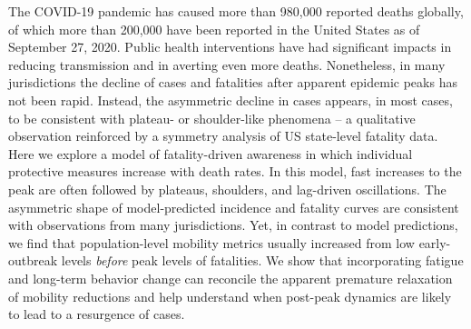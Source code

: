 The COVID-19 pandemic has caused more than 980,000 reported deaths globally, of which more than 200,000 have been reported in the United States as of September 27, 2020. 
Public health interventions have had significant impacts in reducing transmission and in averting even more deaths. 
Nonetheless, in many jurisdictions the decline of cases and fatalities after apparent epidemic peaks has not been rapid.  
Instead, the asymmetric decline in cases appears, in most cases, to be consistent with plateau- or shoulder-like phenomena -- a qualitative observation reinforced by a symmetry analysis of US state-level fatality data.  
Here we explore a model of fatality-driven awareness in which individual protective measures increase with death rates.  
In this model, fast increases to the peak are often followed by plateaus, shoulders, and lag-driven oscillations. 
The asymmetric shape of model-predicted incidence and fatality curves are consistent with observations from many jurisdictions. 
Yet, in contrast to model predictions, we find that population-level mobility metrics usually increased from low early-outbreak levels \emph{before} peak levels of fatalities.  
We show that incorporating fatigue and long-term behavior change can reconcile the apparent premature relaxation of mobility reductions and help understand when post-peak dynamics are likely to lead to a resurgence of cases.
